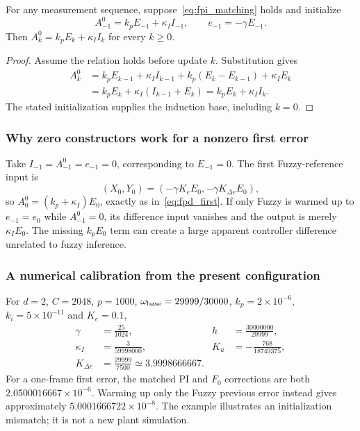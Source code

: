 \begin{btdproposition}
\label{prop:fpi_equivalence}
For any measurement sequence, suppose~\eqref{eq:fpi_matching} holds and
initialize
\begin{equation}
 A^0_{-1}=k_pE_{-1}+\kappa_I I_{-1},\qquad e_{-1}=-\gamma E_{-1}.
 \label{eq:fpi_initialization}
\end{equation}
Then
$A^0_k=k_pE_k+\kappa_I I_k$ for every $k\ge0$.
\end{btdproposition}
\begin{proof}
Assume the relation holds before update $k$. Substitution gives
\begin{align*}
 A^0_k
 &=k_pE_{k-1}+\kappa_I I_{k-1}
   +k_p(E_k-E_{k-1})+\kappa_I E_k\\
 &=k_pE_k+\kappa_I(I_{k-1}+E_k)
 =k_pE_k+\kappa_I I_k.
\end{align*}
The stated initialization supplies the induction base, including $k=0$.
\end{proof}

\subsubsection{Why zero constructors work for a nonzero first error}
Take $I_{-1}=A^0_{-1}=e_{-1}=0$, corresponding to $E_{-1}=0$.
The first Fuzzy-reference input is
\[
 (X_0,Y_0)=(-\gamma K_eE_0,-\gamma K_{\Delta e}E_0),
\]
so
$A^0_0=(k_p+\kappa_I)E_0$, exactly as in~\eqref{eq:fpd_first}.
If only Fuzzy is warmed up to $e_{-1}=e_0$ while $A^0_{-1}=0$, its
difference input vanishes and the output is merely $\kappa_I E_0$.
The missing $k_pE_0$ term can create a large apparent controller difference
unrelated to fuzzy inference.

\subsubsection{A numerical calibration from the present configuration}
For $d=2$, $C=2048$, $p=1000$, $\omega_{\rm base}=29999/30000$,
$k_p=2\times10^{-6}$, $k_i=5\times10^{-11}$ and $K_e=0.1$,
\begin{align}
 \gamma&=\frac{25}{1024},&h&=\frac{30000000}{29999},\nonumber\\
 \kappa_I&=\frac3{59998000},&
 K_u&=-\frac{768}{18749375},\nonumber\\
 K_{\Delta e}&=\frac{29999}{7500}
 \simeq3.9998666667.
 \label{eq:fpd_example_gains}
\end{align}
For a one-frame first error, the matched PI and $F_0$ corrections are both
$2.0500016667\times10^{-6}$. Warming up only the Fuzzy previous error
instead gives approximately $5.0001666722\times10^{-8}$. The example
illustrates an initialization mismatch; it is not a new plant simulation.

